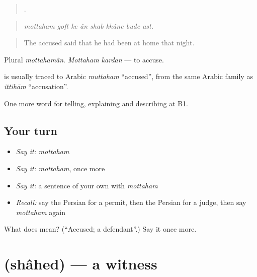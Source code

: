 \begin{quote}
       .
\end{quote}

\begin{quote}
\emph{mottaham goft ke ân shab khâne bude ast.}
\end{quote}

\begin{quote}
The accused said that he had been at home that night.
\end{quote}

Plural \emph{mottahamân}. \emph{Mottaham kardan} — to accuse.

\begin{cousinweb}
\textbf{} is usually traced to Arabic \emph{muttaham} \textquotedblleft{}accused\textquotedblright{}, from the same Arabic family as \emph{ittihām} \textquotedblleft{}accusation\textquotedblright{}.
\end{cousinweb}

\begin{grammarlens}[title={What you've built}]
One more word for telling, explaining and describing at B1.
\end{grammarlens}

\subsection*{Your turn}
\begin{itemize}
\raggedright
  \item \emph{Say it:} \emph{mottaham}
  \item \emph{Say it:} \emph{mottaham}, once more
  \item \emph{Say it:} a sentence of your own with \emph{mottaham}
  \item \emph{Recall:} say the Persian for a permit, then the Persian for a judge, then say \emph{mottaham} again
\end{itemize}

\begin{tcolorbox}[breakable,colback=teal!4,colframe=teal!35!black,title={Before you move on}]
What does  mean? (\textquotedblleft{}Accused; a defendant\textquotedblright{}.) Say it once more.
\end{tcolorbox}
\section[\texorpdfstring{\fa{شاهد} (shâhed)}{شاهد (shâhed)}]{ (shâhed) — a witness}

